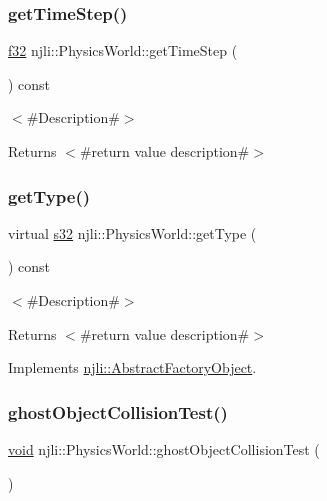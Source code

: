 \subsubsection{\texorpdfstring{get\+Time\+Step()}{getTimeStep()}}
{\footnotesize\ttfamily \mbox{\hyperlink{_util_8h_a5f6906312a689f27d70e9d086649d3fd}{f32}} njli\+::\+Physics\+World\+::get\+Time\+Step (\begin{DoxyParamCaption}{ }\end{DoxyParamCaption}) const}

$<$\#\+Description\#$>$

\begin{DoxyReturn}{Returns}
$<$\#return value description\#$>$ 
\end{DoxyReturn}
\mbox{\label{classnjli_1_1_physics_world_af4b51d0d7e4bf4da6b1be6525c7b7937}} 
\subsubsection{\texorpdfstring{get\+Type()}{getType()}}
{\footnotesize\ttfamily virtual \mbox{\hyperlink{_util_8h_aa62c75d314a0d1f37f79c4b73b2292e2}{s32}} njli\+::\+Physics\+World\+::get\+Type (\begin{DoxyParamCaption}{ }\end{DoxyParamCaption}) const\hspace{0.3cm}{\ttfamily [virtual]}}

$<$\#\+Description\#$>$

\begin{DoxyReturn}{Returns}
$<$\#return value description\#$>$ 
\end{DoxyReturn}


Implements \mbox{\hyperlink{classnjli_1_1_abstract_factory_object_a207c86146d40d0794708ae7f2d4e60a7}{njli\+::\+Abstract\+Factory\+Object}}.

\mbox{\label{classnjli_1_1_physics_world_ae6873032c9a97589b406c69f33383fdb}} 
\subsubsection{\texorpdfstring{ghost\+Object\+Collision\+Test()}{ghostObjectCollisionTest()}}
{\footnotesize\ttfamily \mbox{\hyperlink{_thread_8h_af1e856da2e658414cb2456cb6f7ebc66}{void}} njli\+::\+Physics\+World\+::ghost\+Object\+Collision\+Test (\begin{DoxyParamCaption}{ }\end{DoxyParamCaption})\hspace{0.3cm}{\ttfamily [private]}}

